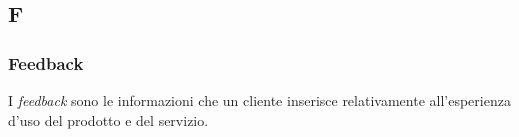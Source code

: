 \subsection{F}

\subsubsection{Feedback}
I \textit{feedback} sono le informazioni che un cliente inserisce relativamente
all'esperienza d'uso del prodotto e del servizio.

\newpage
